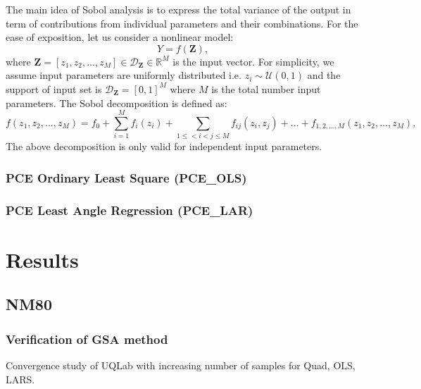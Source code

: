 \documentclass[review]{elsarticle}
\numberwithin{equation}{section}
\numberwithin{equation}{section}
\begin{document}
The main idea of Sobol analysis is to express the total variance of the output in term of contributions from individual parameters and their combinations. For the ease of exposition, let us consider a nonlinear model:
\begin{equation}\label{nonlinear_model}
Y = f(\mathbf{Z}),
\end{equation}
where $\mathbf{Z} = [z_1, z_2, ..., z_M]\in \mathcal{D}_{\mathbf{Z}}\in \mathbb{R}^M$ is the input vector. For simplicity, we assume input parameters are uniformly distributed i.e. $z_i \sim \mathcal{U}(0,1)$ and the support of input set is $\mathcal{D}_\mathbf{Z}  =  [0,1]^M$ where $M$ is the total number input parameters. The Sobol decomposition is defined as:
\begin{equation}\label{sobol_decomp}
f(z_1, z_2, ..., z_M) = f_0+\sum_{i=1}^M f_i(z_i) + \sum_{1\leq<i<j\leq M} f_{ij}(z_i,z_j) + ... + f_{1, 2, ..., M}(z_1, z_2, ..., z_M),
\end{equation}
The above decomposition is only valid for independent input parameters. 
\subsubsection{PCE Ordinary Least Square (PCE\_OLS)}
\subsubsection{PCE Least Angle Regression (PCE\_LAR)}





\section{Results}\label{sec:results}

\subsection{NM80}
\subsubsection{Verification of GSA method}
Convergence study of UQLab with increasing number of samples for Quad, OLS, LARS.
\end{document}
